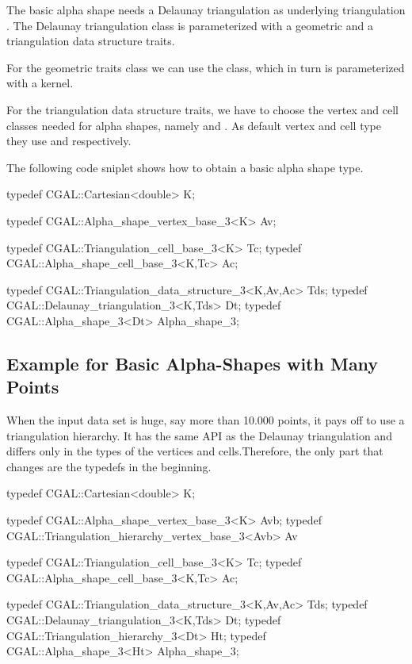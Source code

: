 The basic alpha shape needs a Delaunay triangulation as
underlying triangulation .  The Delaunay triangulation class is
parameterized with a geometric and a triangulation data structure traits.

For the geometric traits class we can use the 
class, which in turn is parameterized with a kernel.

For the triangulation data structure traits, we have to
choose the vertex and cell classes needed for alpha shapes,
namely  and .
As default vertex and cell type they use 
and   respectively. 



The following code sniplet shows how to obtain a basic
alpha shape type.

\begin{cprog}
typedef CGAL::Cartesian<double> K;

typedef CGAL::Alpha_shape_vertex_base_3<K> Av;

typedef CGAL::Triangulation_cell_base_3<K> Tc;
typedef CGAL::Alpha_shape_cell_base_3<K,Tc> Ac;

typedef CGAL::Triangulation_data_structure_3<K,Av,Ac> Tds;
typedef CGAL::Delaunay_triangulation_3<K,Tds> Dt;
typedef CGAL::Alpha_shape_3<Dt> Alpha_shape_3;
\end{cprog}


\subsection{Example for Basic Alpha-Shapes with Many Points
         \label{I1_SectClassicAS3DHier}}

When the input data set is huge, say more than 10.000 points, it pays
off to use a triangulation hierarchy. It has the same API as the
Delaunay triangulation and differs only in the types of the vertices
and cells.Therefore, the only part that changes are the typedefs in the beginning.

\begin{cprog}
typedef CGAL::Cartesian<double> K;

typedef CGAL::Alpha_shape_vertex_base_3<K> Avb;
typedef CGAL::Triangulation_hierarchy_vertex_base_3<Avb> Av 

typedef CGAL::Triangulation_cell_base_3<K> Tc;
typedef CGAL::Alpha_shape_cell_base_3<K,Tc> Ac;

typedef CGAL::Triangulation_data_structure_3<K,Av,Ac> Tds;
typedef CGAL::Delaunay_triangulation_3<K,Tds> Dt;
typedef CGAL::Triangulation_hierarchy_3<Dt> Ht;
typedef CGAL::Alpha_shape_3<Ht> Alpha_shape_3;
\end{cprog}


